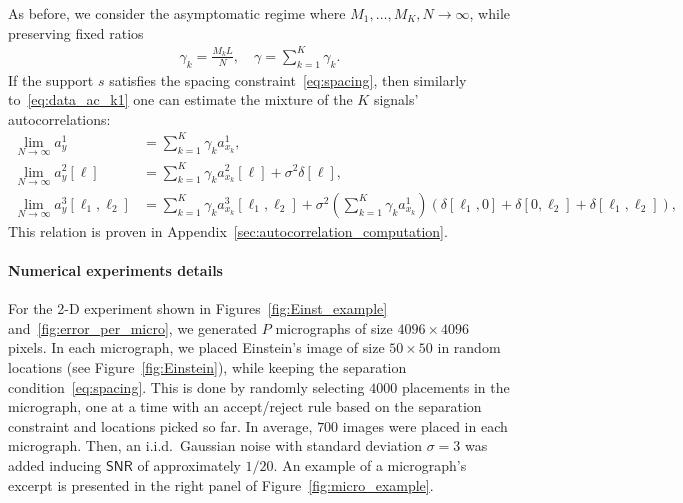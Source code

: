 \documentclass[english,11pt]{article}
\numberwithin{equation}{section}
\theoremstyle{plain}
\theoremstyle{definition}
\theoremstyle{remark}
\theoremstyle{plain}
\theoremstyle{remark}
\theoremstyle{plain}
\theoremstyle{plain}
\newcommand{\SNR}{{\textsf{SNR}}}
\begin{document}
As before, we consider  the asymptomatic regime where $M_1,\ldots,M_K,N\to\infty$, while preserving fixed ratios
\begin{align}
	\gamma_k = \frac{M_k L}{N}, \quad \gamma = \sum_{k=1}^K\gamma_k.
\end{align}
If the support $s$ satisfies the spacing constraint~\eqref{eq:spacing}, then  similarly to~\eqref{eq:data_ac_k1} one can estimate the mixture of the $K$ signals'  autocorrelations:
\begin{align}
\lim_{N\to\infty} a_y^1 & = \sum_{k=1}^K\gamma_k a_{x_k}^1, \nonumber\\
\lim_{N\to\infty} a_y^2[\ell] & = \sum_{k=1}^K\gamma_k a_{x_k}^2[\ell] +\sigma^2\delta[\ell],  \label{eq:data_ac}\\
\lim_{N\to\infty} a_y^3[\ell_1,\ell_2] & = \sum_{k=1}^K\gamma_k a_{x_k}^3[\ell_1,\ell_2] + \sigma^2\left(\sum_{k=1}^K\gamma_k a_{x_k}^1\right)(\delta[\ell_1,0]+\delta[0,\ell_2]+\delta[\ell_1,\ell_2]), \nonumber
\end{align}
This relation is proven in  Appendix~\ref{sec:autocorrelation_computation}.

\paragraph{Numerical experiments details}
For the 2-D experiment shown in Figures~\ref{fig:Einst_example} and~\ref{fig:error_per_micro}, we generated $P$ micrographs of size $4096\times 4096$ pixels. 
In each micrograph, we placed Einstein's image of size $50\times 50$  in random locations (see Figure~\ref{fig:Einstein}), while keeping the separation condition~\eqref{eq:spacing}.  
This is done by randomly selecting $4000$ placements in the micrograph, one at a time with
an accept/reject rule based on the separation constraint and locations picked so far. In average, $700$ images were placed in each micrograph.   
Then, an i.i.d.\ Gaussian noise with standard deviation $\sigma=3$ was added inducing $\SNR$ of approximately $1/20$. An example of a micrograph's excerpt is presented in the right panel of Figure~\ref{fig:micro_example}.
\end{document}
